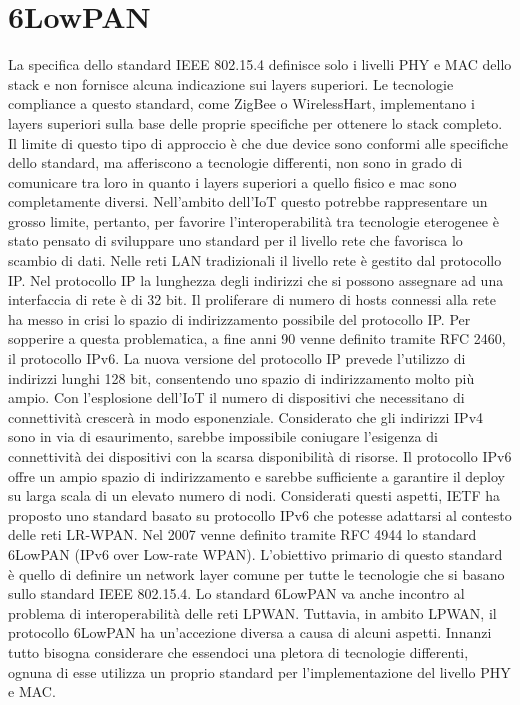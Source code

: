 \documentclass[12pt,a4paper,openright,twoside]{report}
\begin{document}
\section{6LowPAN}
La specifica dello standard IEEE 802.15.4 definisce solo i livelli PHY e MAC dello stack e non fornisce alcuna indicazione sui layers superiori. 
Le tecnologie compliance a questo standard, come ZigBee o WirelessHart, implementano i layers superiori sulla base delle proprie specifiche per ottenere lo stack completo.  
Il limite di questo tipo di approccio \`e che due device sono conformi alle specifiche dello standard, ma afferiscono a tecnologie differenti, non sono in grado di comunicare tra loro in quanto i layers superiori a quello fisico e mac sono completamente diversi. 
Nell'ambito dell'IoT questo potrebbe rappresentare un grosso limite, pertanto, per favorire l'interoperabilit\`a tra tecnologie eterogenee \`e stato pensato di sviluppare uno standard per il livello rete che favorisca lo scambio di dati. 
Nelle reti LAN tradizionali il livello rete \`e gestito dal protocollo IP. 
Nel protocollo IP la lunghezza degli indirizzi che si possono assegnare ad una interfaccia di rete \`e di 32 bit. Il proliferare di numero di hosts connessi alla rete ha messo in crisi lo spazio di indirizzamento possibile del protocollo IP. 
Per sopperire a questa problematica, a fine anni 90 venne definito tramite RFC 2460, il protocollo IPv6. La nuova versione del protocollo IP prevede l'utilizzo di indirizzi lunghi 128 bit, consentendo uno spazio di indirizzamento molto pi\`u ampio.
Con l'esplosione dell'IoT il numero di dispositivi che necessitano di connettivit\`a crescer\`a in modo esponenziale. Considerato che gli indirizzi IPv4 sono in via di esaurimento, sarebbe impossibile coniugare l'esigenza di connettivit\`a dei dispositivi con la scarsa disponibilit\`a di risorse. Il protocollo IPv6 offre un ampio spazio di indirizzamento e sarebbe sufficiente a garantire il deploy su larga scala di un elevato numero di nodi.
Considerati questi aspetti, IETF ha proposto uno standard basato su protocollo IPv6 che potesse adattarsi al contesto delle reti LR-WPAN. Nel 2007 venne definito tramite RFC 4944 lo standard 6LowPAN (IPv6 over Low-rate WPAN). 
L'obiettivo primario di questo standard \`e quello di definire un network layer comune per tutte le tecnologie che si basano sullo standard IEEE 802.15.4.
Lo standard 6LowPAN va anche incontro al problema di interoperabilit\`a delle reti LPWAN. 
Tuttavia, in ambito LPWAN, il protocollo 6LowPAN ha un'accezione diversa a causa di alcuni aspetti. Innanzi tutto bisogna considerare che essendoci una pletora di tecnologie differenti, ognuna di esse utilizza un proprio standard per l'implementazione del livello PHY e MAC. 
\end{document}
